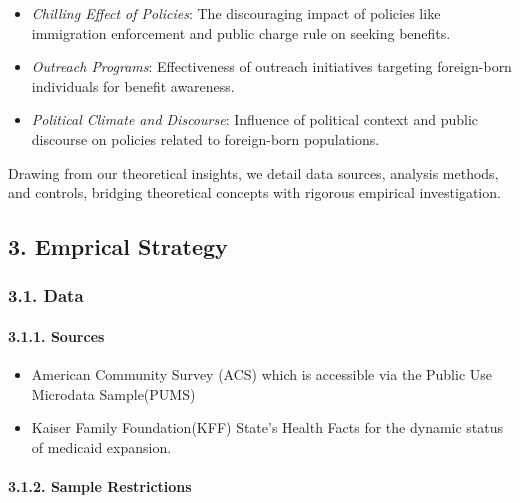 \documentclass[
]{article}
\providecommand{\tightlist}{%
  \setlength{\itemsep}{0pt}\setlength{\parskip}{0pt}}
\begin{document}
\begin{itemize}
\tightlist
\item
  \emph{Chilling Effect of Policies}: The discouraging impact of
  policies like immigration enforcement and public charge rule on
  seeking benefits.
\item
  \emph{Outreach Programs}: Effectiveness of outreach initiatives
  targeting foreign-born individuals for benefit awareness.
\item
  \emph{Political Climate and Discourse}: Influence of political context
  and public discourse on policies related to foreign-born populations.
\end{itemize}

Drawing from our theoretical insights, we detail data sources, analysis
methods, and controls, bridging theoretical concepts with rigorous
empirical investigation.

\hypertarget{emprical-strategy}{%
\subsection{3. Emprical Strategy}\label{emprical-strategy}}

\hypertarget{data}{%
\subsubsection{3.1. Data}\label{data}}

\hypertarget{sources}{%
\paragraph{3.1.1. Sources}\label{sources}}

\begin{itemize}
\tightlist
\item
  American Community Survey (ACS) which is accessible via the Public Use
  Microdata Sample(PUMS)
\item
  Kaiser Family Foundation(KFF) State's Health Facts for the dynamic
  status of medicaid expansion.
\end{itemize}

\hypertarget{sample-restrictions}{%
\paragraph{3.1.2. Sample Restrictions}\label{sample-restrictions}}
\end{document}
